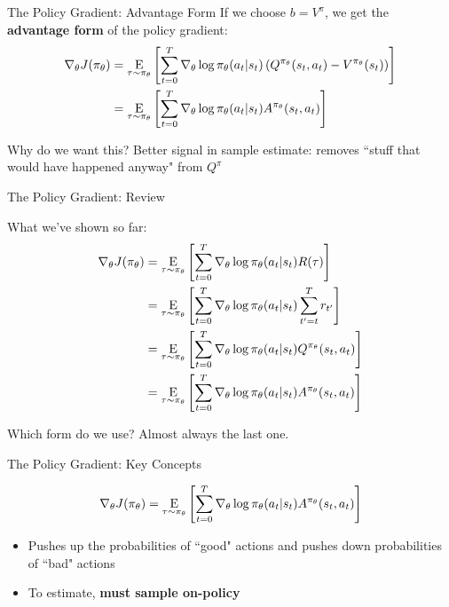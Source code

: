\documentclass[9pt]{beamer}
\newcommand{\underE}[2]{\underset{\begin{subarray}{c}#1 \end{subarray}}{\E}\left[ #2 \right]}
\begin{document}
\begin{frame}{The Policy Gradient: Advantage Form}
If we choose $b = V^{\pi}$, we get the \textbf{advantage form} of the policy gradient:
%
\begin{align*}
\nabla_{\theta} J(\pi_{\theta}) &=\underE{\tau \sim \pi_{\theta}}{\sum_{t=0}^T \nabla_{\theta} \log \pi_{\theta}(a_t | s_t) \left(Q^{\pi_{\theta}}(s_t, a_t) - V^{\pi_{\theta}}(s_t)\right)}\\
 &=\underE{\tau \sim \pi_{\theta}}{\sum_{t=0}^T \nabla_{\theta} \log \pi_{\theta}(a_t | s_t) A^{\pi_{\theta}}(s_t, a_t)}
\end{align*}

Why do we want this? Better signal in sample estimate: removes ``stuff that would have happened anyway" from $Q^{\pi}$
\end{frame}

\begin{frame}{The Policy Gradient: Review}

What we've shown so far:
%
\begin{align*}
\nabla_{\theta} J(\pi_{\theta}) &=\underE{\tau \sim \pi_{\theta}}{\sum_{t=0}^T \nabla_{\theta} \log \pi_{\theta}(a_t | s_t) R(\tau)}\\ 
&=\underE{\tau \sim \pi_{\theta}}{\sum_{t=0}^T \nabla_{\theta} \log \pi_{\theta}(a_t | s_t) \sum_{t'=t}^T r_{t'}}\\
&=\underE{\tau \sim \pi_{\theta}}{\sum_{t=0}^T \nabla_{\theta} \log \pi_{\theta}(a_t | s_t) Q^{\pi_{\theta}}(s_t, a_t)}\\
 &=\underE{\tau \sim \pi_{\theta}}{\sum_{t=0}^T \nabla_{\theta} \log \pi_{\theta}(a_t | s_t) A^{\pi_{\theta}}(s_t, a_t)}
\end{align*}

Which form do we use? Almost always the last one.

\end{frame}

\begin{frame}{The Policy Gradient: Key Concepts}

\begin{equation*}
\nabla_{\theta} J(\pi_{\theta}) = \underE{\tau \sim \pi_{\theta}}{\sum_{t=0}^T \nabla_{\theta} \log \pi_{\theta}(a_t | s_t) A^{\pi_{\theta}}(s_t, a_t)}
\end{equation*}

\begin{itemize}
\item Pushes up the probabilities of ``good" actions and pushes down probabilities of ``bad" actions
\item To estimate, \textbf{must sample on-policy}
\end{itemize}
\end{frame}
\end{document}
